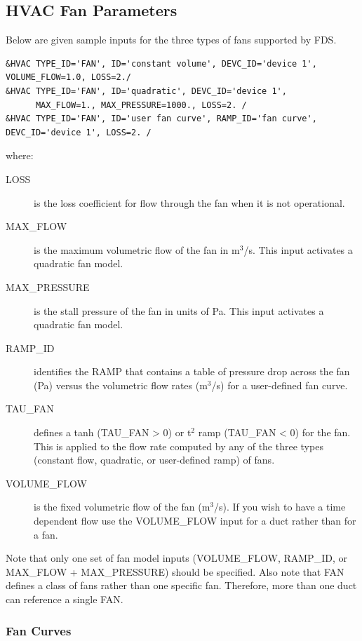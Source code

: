 \documentclass[11pt]{book}
\begin{document}
\subsection{HVAC Fan Parameters}
\label{info:HVACfan}

Below are given sample inputs for the three types of fans supported by FDS.

\begin{lstlisting}
&HVAC TYPE_ID='FAN', ID='constant volume', DEVC_ID='device 1', VOLUME_FLOW=1.0, LOSS=2./
&HVAC TYPE_ID='FAN', ID='quadratic', DEVC_ID='device 1',
      MAX_FLOW=1., MAX_PRESSURE=1000., LOSS=2. /
&HVAC TYPE_ID='FAN', ID='user fan curve', RAMP_ID='fan curve',  DEVC_ID='device 1', LOSS=2. /
\end{lstlisting}

\noindent where:

\begin{description}
\item[{\ct LOSS}] is the loss coefficient for flow through the fan when it is not operational.
\item[{\ct MAX\_FLOW}] is the maximum volumetric flow of the fan in m$^3$/s.  This input activates a quadratic fan model.
\item[{\ct MAX\_PRESSURE}] is the stall pressure of the fan in units of Pa.  This input activates a quadratic fan model.
\item[{\ct RAMP\_ID}] identifies the {\ct RAMP} that contains a table of pressure drop across the fan (Pa) versus the volumetric flow rates (m$^3$/s) for a user-defined fan curve.
\item[{\ct TAU\_FAN}] defines a tanh ({\ct TAU\_FAN} > 0) or t$^2$ ramp ({\ct TAU\_FAN} < 0) for the fan.  This is applied to the flow rate computed by any of the three types (constant flow, quadratic, or user-defined ramp) of fans.
\item[{\ct VOLUME\_FLOW}] is the fixed volumetric flow of the fan (m$^3$/s).  If you wish to have a time dependent flow use the {\ct VOLUME\_FLOW} input for a duct rather than for a fan.
\end{description}

\noindent
Note that only one set of fan model inputs ({\ct VOLUME\_FLOW}, {\ct RAMP\_ID}, or {\ct MAX\_FLOW + MAX\_PRESSURE}) should be specified.
Also note that {\ct FAN} defines a class of fans rather than one specific fan. Therefore, more than one duct can reference a single {\ct FAN}.

\subsubsection{Fan Curves}
\label{info:Fan_Curves}
\end{document}
